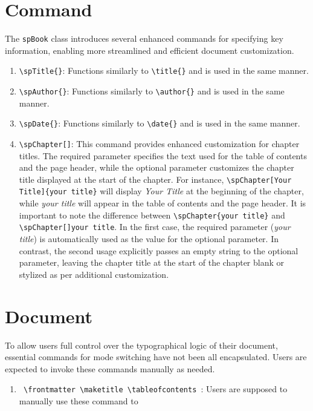 \section{Command}
    The \texttt{spBook} class introduces several enhanced commands for specifying key information, enabling more streamlined and efficient document customization.
    \begin{enumerate}
        \item \texttt{\textbackslash spTitle\{\}}: Functions similarly to \texttt{\textbackslash title\{\}} and is used in the same manner.
        \item \texttt{\textbackslash spAuthor\{\}}: Functions similarly to \texttt{\textbackslash author\{\}} and is used in the same manner.
        \item \texttt{\textbackslash spDate\{\}}: Functions similarly to \texttt{\textbackslash date\{\}} and is used in the same manner.
        \item \texttt{\textbackslash spChapter[]{}}: This command provides enhanced customization for chapter titles. The required parameter specifies the text used for the table of contents and the page header, while the optional parameter customizes the chapter title displayed at the start of the chapter. For instance, \texttt{\textbackslash spChapter[Your Title]\{your title\}} will display \emph{Your Title} at the beginning of the chapter, while \emph{your title} will appear in the table of contents and the page header. It is important to note the difference between \texttt{\textbackslash spChapter\{your title\}} and \texttt{\textbackslash spChapter[]{your title}}. In the first case, the required parameter (\emph{your title}) is automatically used as the value for the optional parameter. In contrast, the second usage explicitly passes an empty string to the optional parameter, leaving the chapter title at the start of the chapter blank or stylized as per additional customization.
    \end{enumerate}

\section{Document}
    To allow users full control over the typographical logic of their document, essential commands for mode switching have not been all encapsulated. Users are expected to invoke these commands manually as needed.

    \begin{enumerate}
        \item \texttt{%
            \textbackslash frontmatter
            \textbackslash maketitle
            \textbackslash tableofcontents
        }: Users are supposed to manually use these command to 
    \end{enumerate}
